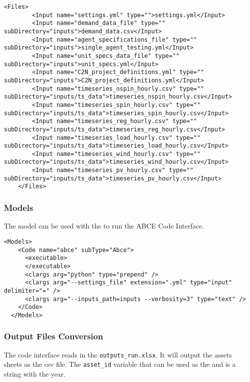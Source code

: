 \begin{itemize}
\begin{lstlisting}[style=XML]
    <Files>
        <Input name="settings.yml" type="">settings.yml</Input>
        <Input name="demand_data_file" type="" subDirectory="inputs">demand_data.csv</Input>
        <Input name="agent_specifications_file" type="" subDirectory="inputs">single_agent_testing.yml</Input>
        <Input name="unit_specs_data_file" type="" subDirectory="inputs">unit_specs.yml</Input>
        <Input name="C2N_project_definitions.yml" type="" subDirectory="inputs">C2N_project_definitions.yml</Input>
        <Input name="timeseries_nspin_hourly.csv" type="" subDirectory="inputs/ts_data">timeseries_nspin_hourly.csv</Input>
        <Input name="timeseries_spin_hourly.csv" type="" subDirectory="inputs/ts_data">timeseries_spin_hourly.csv</Input>
        <Input name="timeseries_reg_hourly.csv" type="" subDirectory="inputs/ts_data">timeseries_reg_hourly.csv</Input>
        <Input name="timeseries_load_hourly.csv" type="" subDirectory="inputs/ts_data">timeseries_load_hourly.csv</Input>
        <Input name="timeseries_wind_hourly.csv" type="" subDirectory="inputs/ts_data">timeseries_wind_hourly.csv</Input>
        <Input name="timeseries_pv_hourly.csv" type="" subDirectory="inputs/ts_data">timeseries_pv_hourly.csv</Input>
    </Files>
\end{lstlisting}

\subsubsection{Models}

The  model can be used with the
 to run the ABCE Code Interface.

\begin{lstlisting}[style=XML]
  <Models>
    <Code name="abce" subType="Abce">
      <executable>
      </executable>
      <clargs arg="python" type="prepend" />
      <clargs arg="--settings_file" extension=".yml" type="input" delimiter="=" />
      <clargs arg="--inputs_path=inputs --verbosity=3" type="text" />
    </Code>
  </Models>
\end{lstlisting}

\subsubsection{Output Files Conversion}

The code interface reads in the \texttt{outputs\ABCE_run\outputs.xlsx}. 
It will output the assets sheets as the csv file. The \texttt{asset_id} 
variable that can be used as the  and is a
string with the year. 


\end{itemize}
